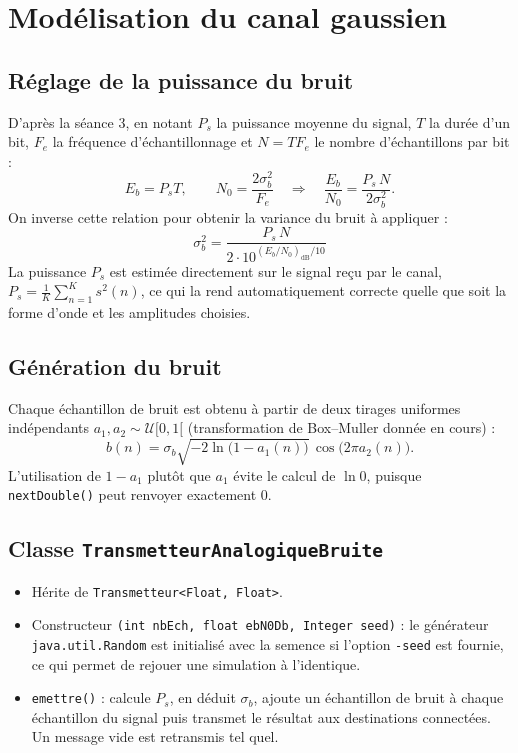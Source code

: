 \documentclass[11pt,a4paper]{article}
\newcommand{\EbNo}{E_b/N_0}
\begin{document}
\section{Modélisation du canal gaussien}
\subsection{Réglage de la puissance du bruit}
D'après la séance 3, en notant $P_s$ la puissance moyenne du signal, $T$ la durée d'un bit, $F_e$ la fréquence d'échantillonnage et $N = TF_e$ le nombre d'échantillons par bit :
\[
E_b = P_s T,\qquad N_0 = \frac{2\sigma_b^2}{F_e}
\quad\Longrightarrow\quad
\frac{E_b}{N_0} = \frac{P_s\,N}{2\sigma_b^2}.
\]
On inverse cette relation pour obtenir la variance du bruit à appliquer :
\[
\boxed{\sigma_b^2 = \frac{P_s\,N}{2\cdot 10^{(\EbNo)_{\text{dB}}/10}}}
\]
La puissance $P_s$ est estimée directement sur le signal reçu par le canal, $P_s = \frac1K\sum_{n=1}^{K}s^2(n)$, ce qui la rend automatiquement correcte quelle que soit la forme d'onde et les amplitudes choisies.

\subsection{Génération du bruit}
Chaque échantillon de bruit est obtenu à partir de deux tirages uniformes indépendants $a_1, a_2\sim\mathcal U[0,1[$ (transformation de Box--Muller donnée en cours) :
\[ b(n) = \sigma_b\sqrt{-2\ln\big(1-a_1(n)\big)}\,\cos\big(2\pi a_2(n)\big). \]
L'utilisation de $1-a_1$ plutôt que $a_1$ évite le calcul de $\ln 0$, puisque \texttt{nextDouble()} peut renvoyer exactement 0.

\subsection{Classe \texttt{TransmetteurAnalogiqueBruite}}
\begin{itemize}
  \item Hérite de \texttt{Transmetteur<Float, Float>}.
  \item Constructeur \texttt{(int nbEch, float ebN0Db, Integer seed)} : le générateur \texttt{java.util.Random} est initialisé avec la semence si l'option \texttt{-seed} est fournie, ce qui permet de rejouer une simulation à l'identique.
  \item \texttt{emettre()} : calcule $P_s$, en déduit $\sigma_b$, ajoute un échantillon de bruit à chaque échantillon du signal puis transmet le résultat aux destinations connectées. Un message vide est retransmis tel quel.
\end{itemize}
\end{document}
